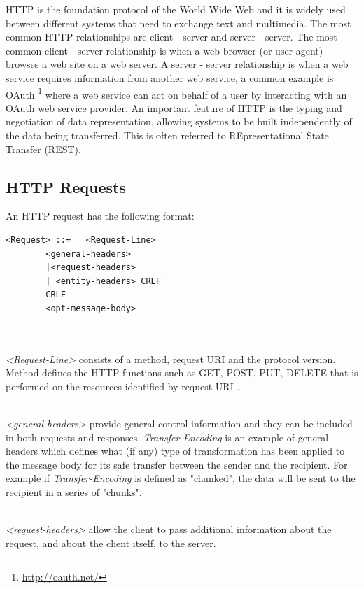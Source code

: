 \documentclass[a4paper,11pt,twoside]{article}
\begin{document}
HTTP is the foundation protocol of the World Wide Web and it is widely used between different systems that need to exchange text and multimedia.  The most common HTTP relationships are client - server and server - server.  The most common client - server relationship is when a web browser (or user agent) browses a web site on a web server.  A server - server relationship is when a web service requires information from another web service, a common example is OAuth \footnote{\label{OAuth} \url{http://oauth.net/}} where a web service can act on behalf of a user by interacting with an OAuth web service provider.  An important feature of HTTP is the typing and negotiation of data representation, allowing systems to be built independently of the data being transferred. This is often referred to REpresentational State Transfer (REST).

\subsection{HTTP Requests} \label{Requests}
An HTTP request has the following format:\bigskip

\begin{lstlisting}[language=terminal, xleftmargin=.3in,xrightmargin=3.25in]
<Request> ::=	<Request-Line>
		<general-headers>
		|<request-headers>
		| <entity-headers> CRLF
		CRLF 
		<opt-message-body>
		
\end{lstlisting} 
\noindent\\
\textit{<Request-Line>} consists of a method, request URI and the protocol version. Method defines the HTTP functions such as GET, POST, PUT, DELETE that is performed on the resources identified by request URI . 

\noindent\\
\textit{<general-headers>} provide general control information and they can be included in both requests and responses. \textit{Transfer-Encoding} is an example of general headers which defines what (if any) type of transformation has been applied to the message body for its safe transfer between the sender and the recipient. For example if \textit{Transfer-Encoding} is defined as "chunked", the data will be sent to the recipient in a series of "chunks". 

\noindent\\
\textit{<request-headers>} allow the client to pass additional information about the request, and about the client itself, to the server. 
\end{document}
